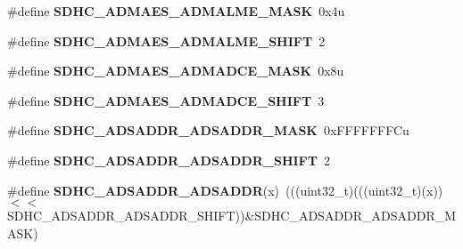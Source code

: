 \begin{DoxyCompactItemize}
\item 
\#define {\bfseries S\+D\+H\+C\+\_\+\+A\+D\+M\+A\+E\+S\+\_\+\+A\+D\+M\+A\+L\+M\+E\+\_\+\+M\+A\+SK}~0x4u\hypertarget{group__SDHC__Register__Masks_ga12cecea9616404f0ae9cae658e7c8849}{}\label{group__SDHC__Register__Masks_ga12cecea9616404f0ae9cae658e7c8849}

\item 
\#define {\bfseries S\+D\+H\+C\+\_\+\+A\+D\+M\+A\+E\+S\+\_\+\+A\+D\+M\+A\+L\+M\+E\+\_\+\+S\+H\+I\+FT}~2\hypertarget{group__SDHC__Register__Masks_ga75e811daac256a56735bf2a822440434}{}\label{group__SDHC__Register__Masks_ga75e811daac256a56735bf2a822440434}

\item 
\#define {\bfseries S\+D\+H\+C\+\_\+\+A\+D\+M\+A\+E\+S\+\_\+\+A\+D\+M\+A\+D\+C\+E\+\_\+\+M\+A\+SK}~0x8u\hypertarget{group__SDHC__Register__Masks_ga2c0005f89f635749f423284e92025434}{}\label{group__SDHC__Register__Masks_ga2c0005f89f635749f423284e92025434}

\item 
\#define {\bfseries S\+D\+H\+C\+\_\+\+A\+D\+M\+A\+E\+S\+\_\+\+A\+D\+M\+A\+D\+C\+E\+\_\+\+S\+H\+I\+FT}~3\hypertarget{group__SDHC__Register__Masks_gab96190a44e154d4acd156f0026d4c363}{}\label{group__SDHC__Register__Masks_gab96190a44e154d4acd156f0026d4c363}

\item 
\#define {\bfseries S\+D\+H\+C\+\_\+\+A\+D\+S\+A\+D\+D\+R\+\_\+\+A\+D\+S\+A\+D\+D\+R\+\_\+\+M\+A\+SK}~0x\+F\+F\+F\+F\+F\+F\+F\+Cu\hypertarget{group__SDHC__Register__Masks_gaf351e8cc179a6507219df80133e901dd}{}\label{group__SDHC__Register__Masks_gaf351e8cc179a6507219df80133e901dd}

\item 
\#define {\bfseries S\+D\+H\+C\+\_\+\+A\+D\+S\+A\+D\+D\+R\+\_\+\+A\+D\+S\+A\+D\+D\+R\+\_\+\+S\+H\+I\+FT}~2\hypertarget{group__SDHC__Register__Masks_ga6bad5e40bfb6829aa79079fa8748a7d1}{}\label{group__SDHC__Register__Masks_ga6bad5e40bfb6829aa79079fa8748a7d1}

\item 
\#define {\bfseries S\+D\+H\+C\+\_\+\+A\+D\+S\+A\+D\+D\+R\+\_\+\+A\+D\+S\+A\+D\+DR}(x)~(((uint32\+\_\+t)(((uint32\+\_\+t)(x))$<$$<$S\+D\+H\+C\+\_\+\+A\+D\+S\+A\+D\+D\+R\+\_\+\+A\+D\+S\+A\+D\+D\+R\+\_\+\+S\+H\+I\+FT))\&S\+D\+H\+C\+\_\+\+A\+D\+S\+A\+D\+D\+R\+\_\+\+A\+D\+S\+A\+D\+D\+R\+\_\+\+M\+A\+SK)\hypertarget{group__SDHC__Register__Masks_ga4e9df4f22bb72c4482aadfdddc916b5e}{}\label{group__SDHC__Register__Masks_ga4e9df4f22bb72c4482aadfdddc916b5e}


\end{DoxyCompactItemize}
